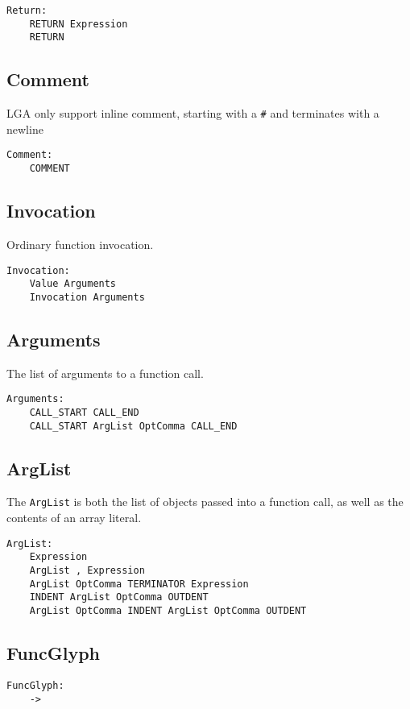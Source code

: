 \documentclass[10pt]{report}
\begin{document}
\begin{verbatim}
Return:
    RETURN Expression
    RETURN
\end{verbatim}


\subsection{Comment}
LGA only support inline comment, starting with a \texttt{\#} and terminates with a newline
\begin{verbatim}
Comment:
    COMMENT
\end{verbatim}

\subsection{Invocation}
Ordinary function invocation.

\begin{verbatim}
Invocation:
    Value Arguments
    Invocation Arguments
\end{verbatim}

\subsection{Arguments}

The list of arguments to a function call.
\begin{verbatim}
Arguments:
    CALL_START CALL_END
    CALL_START ArgList OptComma CALL_END
\end{verbatim}

\subsection{ArgList}

The \texttt{ArgList} is both the list of objects passed into a function call, as well as the contents of an array literal.
\begin{verbatim}
ArgList:
    Expression
    ArgList , Expression
    ArgList OptComma TERMINATOR Expression
    INDENT ArgList OptComma OUTDENT
    ArgList OptComma INDENT ArgList OptComma OUTDENT
\end{verbatim}

\subsection{FuncGlyph}

\begin{verbatim}
FuncGlyph:
    ->
\end{verbatim}
\end{document}
